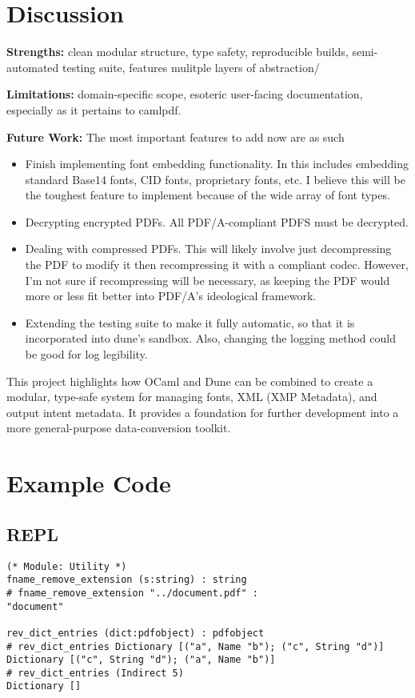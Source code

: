 \documentclass[11pt]{article}
\begin{document}
\section*{Discussion}
\textbf{Strengths:} clean modular structure, type safety, reproducible builds, semi-automated testing suite, features mulitple layers of abstraction/  

\textbf{Limitations:} domain-specific scope, esoteric user-facing documentation, especially as it pertains to camlpdf.  

\textbf{Future Work:} The most important features to add now are as such
\begin{itemize}
  \item Finish implementing font embedding functionality. In this includes embedding standard Base14 fonts, CID fonts, proprietary fonts, etc. I believe this will be the toughest feature to implement because of the wide array of font types. 
  \item Decrypting encrypted PDFs. All PDF/A-compliant PDFS must be decrypted.
  \item Dealing with compressed PDFs. This will likely involve just decompressing the PDF to modify it then recompressing it with a compliant codec. However, I'm not sure if recompressing will be necessary, as keeping the PDF would more or less fit better into PDF/A's ideological framework.
  \item Extending the testing suite to make it fully automatic, so that it is incorporated into dune's sandbox. Also, changing the logging method could be good for log legibility. 
\end{itemize}
  

This project highlights how OCaml and Dune can be combined to create a modular, type-safe system for managing fonts, XML (XMP Metadata), and output intent metadata. It provides a foundation for further development into a more general-purpose data-conversion toolkit.

\section*{Example Code}
\subsection*{REPL}
\begin{verbatim}
(* Module: Utility *)
fname_remove_extension (s:string) : string
# fname_remove_extension "../document.pdf" : 
"document"

rev_dict_entries (dict:pdfobject) : pdfobject
# rev_dict_entries Dictionary [("a", Name "b"); ("c", String "d")]
Dictionary [("c", String "d"); ("a", Name "b")]
# rev_dict_entries (Indirect 5)
Dictionary []




\end{verbatim}
\end{document}
